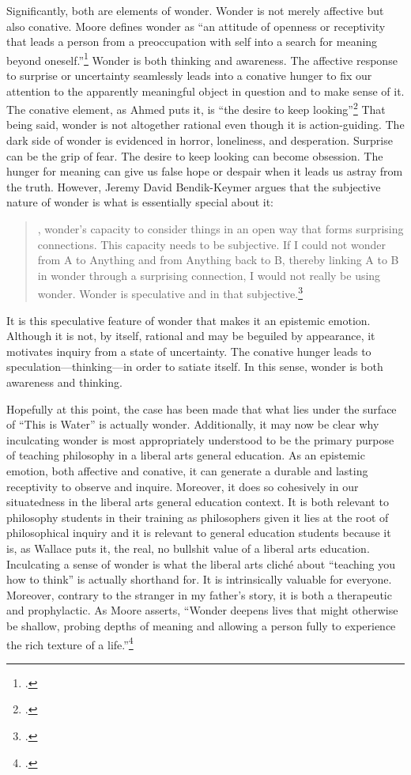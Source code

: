\documentclass[letterpaper,notitlepage,12pt]{article}
\begin{document}
Significantly, both are elements of wonder.
Wonder is not merely affective but also conative.
Moore defines wonder as ``an attitude of openness or receptivity that leads a
person from a preoccupation with self into a search for meaning beyond
oneself.''\footcite[p. 269]{moore_truth_2005}
Wonder is both thinking and awareness.
The affective response to surprise or uncertainty seamlessly leads into a
conative hunger to fix our attention to the apparently meaningful object in 
question and to make sense of it.
The conative element, as Ahmed puts it, is ``the desire to keep
looking''\footcite[p. 180]{ahmed_cultural_2004}
That being said, wonder is not altogether rational even though it is
action-guiding.
The dark side of wonder is evidenced in horror, loneliness, and desperation.
Surprise can be the grip of fear.
The desire to keep looking can become obsession.
The hunger for meaning can give us false hope or despair when it leads us astray
from the truth.
However, Jeremy David Bendik-Keymer argues that the subjective nature of wonder
is what is essentially special about it:
\begin{quotation}
\ldotsnamely, wonder’s capacity to consider things in an open way that forms
surprising connections. This capacity needs to be subjective. If I could not wonder
from A to Anything and from Anything back to B, thereby linking A to B in wonder
through a surprising connection, I would not really be using wonder. Wonder is
speculative and in that subjective.\footcite[p.
341]{bendik-keymer_reasonableness_2017}
\end{quotation}
It is this speculative feature of wonder that makes it an epistemic emotion.
Although it is not, by itself, rational and may be beguiled by appearance, it
motivates inquiry from a state of uncertainty.
The conative hunger leads to speculation---thinking---in order to satiate
itself.
In this sense, wonder is both awareness and thinking.

Hopefully at this point, the case has been made that what lies under the surface
of ``This is Water'' is actually wonder.
Additionally, it may now be clear why inculcating wonder is most appropriately
understood to be the primary purpose of teaching philosophy in a liberal arts
general education.
As an epistemic emotion, both affective and conative, it can generate a durable
and lasting receptivity to observe and inquire.
Moreover, it does so cohesively in our situatedness in the liberal arts general
education context.
It is both relevant to philosophy students in their training as philosophers
given it lies at the root of philosophical inquiry and it is relevant to general
education students because it is, as Wallace puts it, the real, no bullshit
value of a liberal arts education.
Inculcating a sense of wonder is what the liberal arts clich\'e about ``teaching
you how to think'' is actually shorthand for.
It is intrinsically valuable for everyone.
Moreover, contrary to the stranger in my father's story, it is both a
therapeutic and prophylactic.  
As Moore asserts, ``Wonder deepens lives that
might otherwise be shallow, probing depths of meaning and allowing a person
fully to experience the rich texture of a life.''\footcite[p.
272]{moore_truth_2005}
\end{document}
